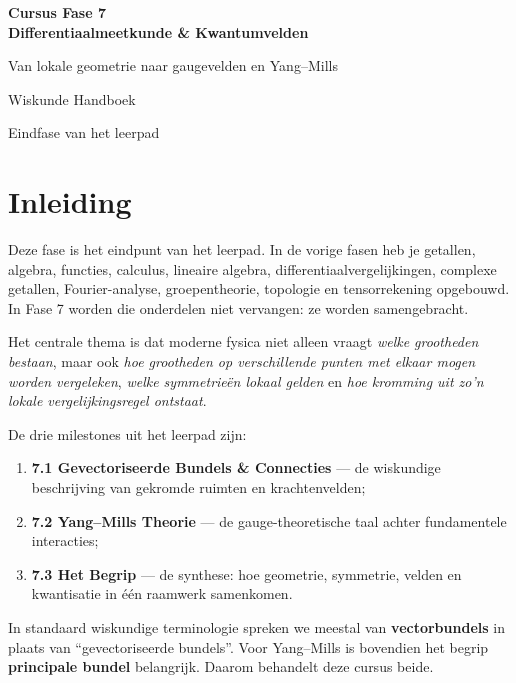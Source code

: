 \documentclass[11pt,a4paper]{article}
\begin{document}
\begin{titlepage}
\centering
\vspace*{2.2cm}
{\Huge\bfseries Cursus Fase 7\\[0.35cm] Differentiaalmeetkunde \& Kwantumvelden\par}
\vspace{1cm}
{\Large Van lokale geometrie naar gaugevelden en Yang--Mills\par}
\vfill
{\large Wiskunde Handboek\par}
\vspace{0.4cm}
{\large Eindfase van het leerpad\par}
\vspace*{2cm}
\end{titlepage}

\tableofcontents
\newpage

\section*{Inleiding}

Deze fase is het eindpunt van het leerpad. In de vorige fasen heb je getallen, algebra, functies, calculus, lineaire algebra, differentiaalvergelijkingen, complexe getallen, Fourier-analyse, groepentheorie, topologie en tensorrekening opgebouwd. In Fase 7 worden die onderdelen niet vervangen: ze worden samengebracht.

Het centrale thema is dat moderne fysica niet alleen vraagt \emph{welke grootheden bestaan}, maar ook \emph{hoe grootheden op verschillende punten met elkaar mogen worden vergeleken}, \emph{welke symmetrieën lokaal gelden} en \emph{hoe kromming uit zo'n lokale vergelijkingsregel ontstaat}.

De drie milestones uit het leerpad zijn:
\begin{enumerate}
    \item \textbf{7.1 Gevectoriseerde Bundels \& Connecties} --- de wiskundige beschrijving van gekromde ruimten en krachtenvelden;
    \item \textbf{7.2 Yang--Mills Theorie} --- de gauge-theoretische taal achter fundamentele interacties;
    \item \textbf{7.3 Het Begrip} --- de synthese: hoe geometrie, symmetrie, velden en kwantisatie in één raamwerk samenkomen.
\end{enumerate}

In standaard wiskundige terminologie spreken we meestal van \textbf{vectorbundels} in plaats van ``gevectoriseerde bundels''. Voor Yang--Mills is bovendien het begrip \textbf{principale bundel} belangrijk. Daarom behandelt deze cursus beide.
\end{document}
